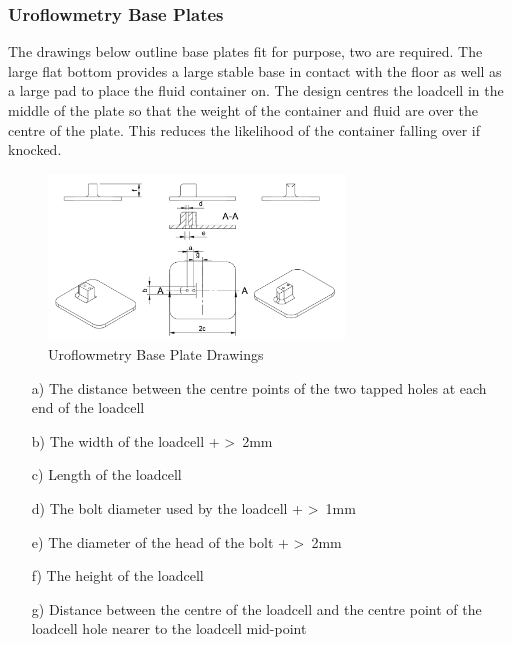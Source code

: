 \subsubsection{Uroflowmetry Base Plates}

The drawings below outline base plates fit for purpose, two are required. The large flat bottom provides a large stable base in contact with the floor as well as a large pad to place the fluid container on. 
The design centres the loadcell in the middle of the plate so that the weight of the container and fluid are over the centre of the plate. This reduces the likelihood of the container falling over if knocked.

\begin{figure}[h]
    \centering
    \includegraphics[width=0.7\textwidth]{Figures/SupportDrawings/uf_base_plate_drawing.png}
    \caption{Uroflowmetry Base Plate Drawings}
    \label{fig:ufbaseplatedrawing}
  \end{figure}

  \begin{enumerate}
    \item[a)] The distance between the centre points of the two tapped holes at each end of the loadcell
    \item[b)] The width of the loadcell + \textgreater\ 2mm
    \item[c)] Length of the loadcell
    \item[d)] The bolt diameter used by the loadcell + \textgreater\ 1mm
    \item[e)] The diameter of the head of the bolt + \textgreater\ 2mm 
    \item[f)] The height of the loadcell
    \item[g)] Distance between the centre of the loadcell and the centre point of the loadcell hole nearer to the loadcell mid-point
  \end{enumerate}